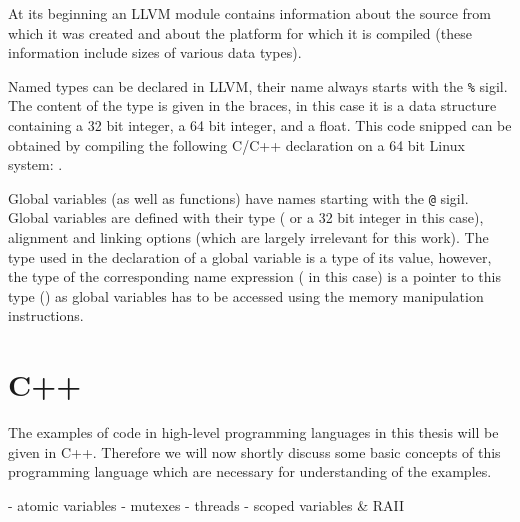 
\noindent
At its beginning an LLVM module contains information about the source from which it was created and about the platform for which it is compiled (these information include sizes of various data types).


\noindent
Named types can be declared in LLVM, their name always starts with the \texttt{\%} sigil.
The content of the type is given in the braces, in this case it is a data structure containing a 32 bit integer, a 64 bit integer, and a float.
This code snipped can be obtained by compiling the following C/C++ declaration on a 64 bit Linux system: .


\noindent
Global variables (as well as functions) have names starting with the \texttt{@} sigil.
Global variables are defined with their type ( or a 32 bit integer in this case), alignment and linking options (which are largely irrelevant for this work).
The type used in the declaration of a global variable is a type of its value, however, the type of the corresponding name expression ( in this case) is a pointer to this type () as global variables has to be accessed using the memory manipulation instructions.




\section{C++}

The examples of code in high-level programming languages in this thesis will be given in C++.
Therefore we will now shortly discuss some basic concepts of this programming language which are necessary for understanding of the examples.

- atomic variables
- mutexes
- threads
- scoped variables \& RAII
